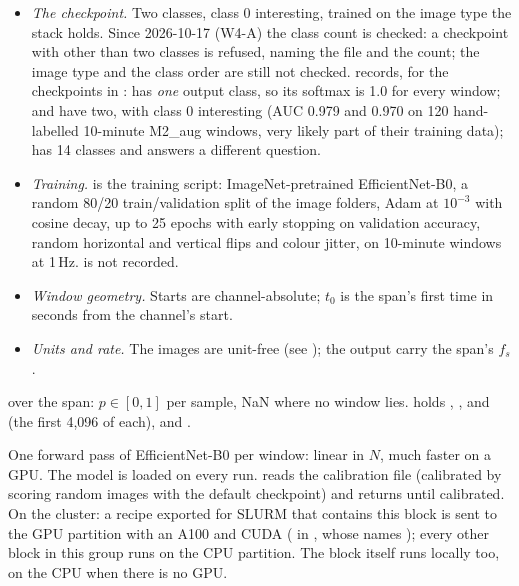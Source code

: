 \begin{itemize}
\item \emph{The checkpoint.} Two classes, class 0 interesting, trained on the image type the
  stack holds. Since 2026-10-17 (W4-A) the class count is checked: a checkpoint with other than two
  classes is refused, naming the file and the count; the image type and the class order are still
  not checked. 
  records, for the checkpoints in :  has \emph{one}
  output class, so its softmax is 1.0 for every window;  and
   have two, with class 0 interesting (AUC 0.979 and 0.970 on 120
  hand-labelled 10-minute M2\_aug windows, very likely part of their training data);
   has 14 classes and answers a different question.
\item \emph{Training.}  is the training script: ImageNet-pretrained
  EfficientNet-B0, a random 80/20 train/validation split of the image folders, Adam at
  $10^{-3}$ with cosine decay, up to 25 epochs with early stopping on validation accuracy,
  random horizontal and vertical flips and colour jitter, on 10-minute windows at 1\,Hz.
   is not recorded.
\item \emph{Window geometry.} Starts are channel-absolute; $t_0$ is the span's first time in
  seconds from the channel's start.
\item \emph{Units and rate.} The images are unit-free (see );
  the output  carry the span's $f_s$.
\end{itemize}

 over the span: $p \in [0,1]$ per sample, NaN where no window lies. 
holds , ,  and  (the first
4{,}096 of each),  and .

One forward pass of EfficientNet-B0 per window: linear in $N$, much faster on a GPU. The
model is loaded on every run.  reads the calibration file (calibrated by
scoring random images with the default checkpoint) and returns  until calibrated.
On the cluster: a recipe exported for SLURM that contains this block is sent to the GPU
partition with an A100 and CUDA ( in ,
whose  names ); every other block in this group runs on
the CPU partition. The block itself runs locally too, on the CPU when there is no GPU.

